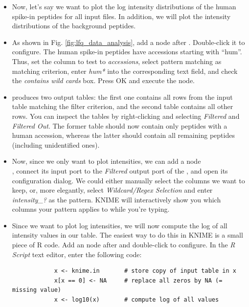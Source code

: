 \begin{itemize}
    \item Now, let's say we want to plot the log intensity distributions of the human spike-in peptides for all input files. In addition, we will plot the intensity distributions of the background peptides.
    \item As shown in Fig. \ref{fig:lfq_data_analysis}, add a  node  after . Double-click it to configure. The human spike-in peptides have accessions starting with ``hum''. Thus, set the column to test to \textit{accessions}, select pattern matching as matching criterion, enter \textit{hum*} into the corresponding text field, and check the \textit{contains wild cards} box. Press OK and execute the node.
    \item {} produces two output tables: the first one contains all rows from the input table matching the filter criterion, and the second table contains all other rows. You can inspect the tables by right-clicking and selecting \textit{Filtered} and \textit{Filtered Out}. The former table should now contain only peptides with a human accession, whereas the latter should contain all remaining peptides (including unidentified ones).
    \item Now, since we only want to plot intensities, we can add a  node \\ , connect its input port to the \textit{Filtered} output port of the , and open its configuration dialog. We could either manually select the columns we want to keep, or, more elegantly, select \textit{Wildcard/Regex Selection} and enter \textit{intensity\_?} as the pattern. KNIME will interactively show you which columns your pattern applies to while you're typing.
    \item Since we want to plot log intensities, we will now compute the log of all intensity values in our table. The easiest way to do this in KNIME is a small piece of R code. Add an  node  after  and double-click to configure. In the \textit{R Script} text editor, enter the following code:
        \begin{lstlisting}
            x <- knime.in       # store copy of input table in x
            x[x == 0] <- NA     # replace all zeros by NA (= missing value)
            x <- log10(x)       # compute log of all values

\end{lstlisting}
\end{itemize}
